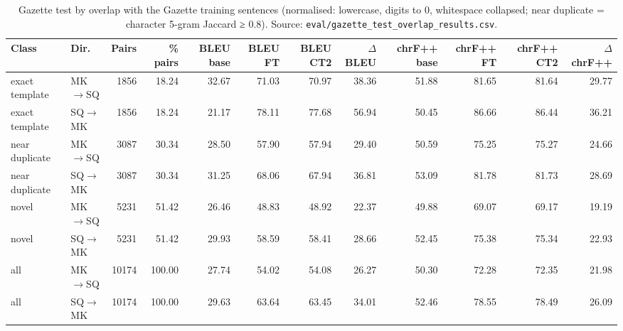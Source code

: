 \begin{table}[t]
\centering
\small
\begin{tabular}{llrrrrrrrrrr}
\toprule
Class & Dir. & Pairs & \% pairs & BLEU base & BLEU FT & BLEU CT2 & $\Delta$BLEU & chrF++ base & chrF++ FT & chrF++ CT2 & $\Delta$chrF++ \\
\midrule
exact template & MK$\rightarrow$SQ & 1856 & 18.24 & 32.67 & 71.03 & 70.97 & 38.36 & 51.88 & 81.65 & 81.64 & 29.77 \\
exact template & SQ$\rightarrow$MK & 1856 & 18.24 & 21.17 & 78.11 & 77.68 & 56.94 & 50.45 & 86.66 & 86.44 & 36.21 \\
near duplicate & MK$\rightarrow$SQ & 3087 & 30.34 & 28.50 & 57.90 & 57.94 & 29.40 & 50.59 & 75.25 & 75.27 & 24.66 \\
near duplicate & SQ$\rightarrow$MK & 3087 & 30.34 & 31.25 & 68.06 & 67.94 & 36.81 & 53.09 & 81.78 & 81.73 & 28.69 \\
novel & MK$\rightarrow$SQ & 5231 & 51.42 & 26.46 & 48.83 & 48.92 & 22.37 & 49.88 & 69.07 & 69.17 & 19.19 \\
novel & SQ$\rightarrow$MK & 5231 & 51.42 & 29.93 & 58.59 & 58.41 & 28.66 & 52.45 & 75.38 & 75.34 & 22.93 \\
all & MK$\rightarrow$SQ & 10174 & 100.00 & 27.74 & 54.02 & 54.08 & 26.27 & 50.30 & 72.28 & 72.35 & 21.98 \\
all & SQ$\rightarrow$MK & 10174 & 100.00 & 29.63 & 63.64 & 63.45 & 34.01 & 52.46 & 78.55 & 78.49 & 26.09 \\
\bottomrule
\end{tabular}
\caption{Gazette test by overlap with the Gazette training sentences (normalised: lowercase, digits to 0, whitespace collapsed; near duplicate = character 5-gram Jaccard ≥ 0.8). Source: \texttt{eval/gazette\_test\_overlap\_results.csv}.}
\label{tab:e01-overlap}
\end{table}
